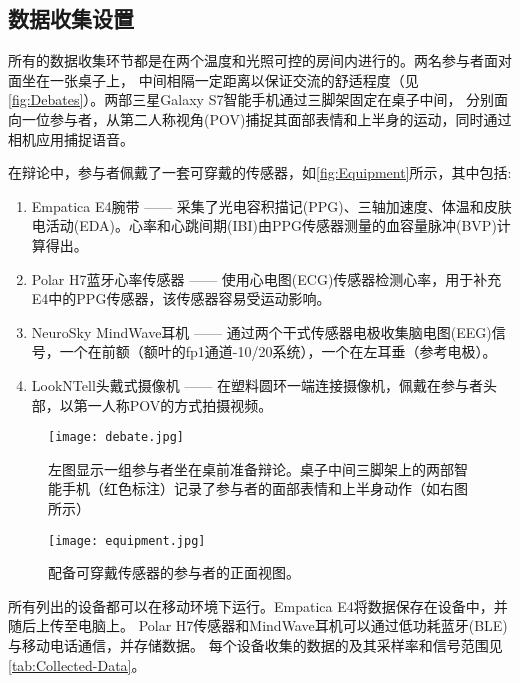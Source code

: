 \subsection{数据收集设置}
所有的数据收集环节都是在两个温度和光照可控的房间内进行的。两名参与者面对面坐在一张桌子上，
中间相隔一定距离以保证交流的舒适程度（见\autoref{fig:Debates}）。两部三星Galaxy S7智能手机通过三脚架固定在桌子中间，
分别面向一位参与者，从第二人称视角(POV)捕捉其面部表情和上半身的运动，同时通过相机应用捕捉语音。

在辩论中，参与者佩戴了一套可穿戴的传感器，如\autoref{fig:Equipment}所示，其中包括:
\begin{enumerate}
\item Empatica E4腕带 —— 采集了光电容积描记(PPG)、三轴加速度、体温和皮肤电活动(EDA)。心率和心跳间期(IBI)由PPG传感器测量的血容量脉冲(BVP)计算得出。
\item Polar H7蓝牙心率传感器 —— 使用心电图(ECG)传感器检测心率，用于补充E4中的PPG传感器，该传感器容易受运动影响。
\item NeuroSky MindWave耳机 —— 通过两个干式传感器电极收集脑电图(EEG)信号，一个在前额（额叶的fp1通道-10/20系统），一个在左耳垂（参考电极）。
\item LookNTell头戴式摄像机 —— 在塑料圆环一端连接摄像机，佩戴在参与者头部，以第一人称POV的方式拍摄视频。
\end{enumerate}


\begin{figure}[htbp]
    \centering
    \texttt{[image: debate.jpg]}
    \caption[辩论图片]{左图显示一组参与者坐在桌前准备辩论。桌子中间三脚架上的两部智能手机（红色标注）记录了参与者的面部表情和上半身动作（如右图所示）}{\label{fig:Debates}}
\end{figure}
\begin{figure}[htbp]
    \centering
    \texttt{[image: equipment.jpg]}
    \caption[设备图片]{配备可穿戴传感器的参与者的正面视图。}{\label{fig:Equipment}}
\end{figure}

所有列出的设备都可以在移动环境下运行。Empatica E4将数据保存在设备中，并随后上传至电脑上。
Polar H7传感器和MindWave耳机可以通过低功耗蓝牙(BLE)与移动电话通信，并存储数据。
每个设备收集的数据的及其采样率和信号范围见\autoref{tab:Collected-Data}。

